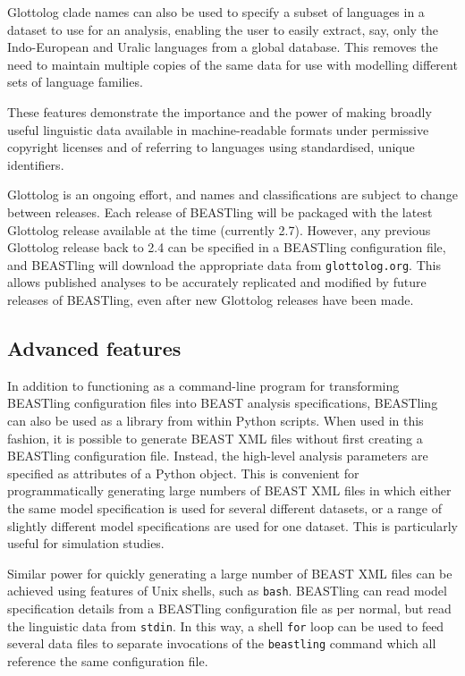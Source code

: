 \documentclass[twocolumn,10pt]{scrartcl}
\begin{document}
Glottolog clade names can also be used to specify a subset of languages in a dataset to use for an analysis, enabling the user to easily extract, say, only the Indo-European and Uralic languages from a global database.  This removes the need to maintain multiple copies of the same data for use with modelling different sets of language families.

These features demonstrate the importance and the power of making broadly useful linguistic data available in machine-readable formats under permissive copyright licenses and of referring to languages using standardised, unique identifiers.

Glottolog is an ongoing effort, and names and classifications are subject to change between releases.  Each release of BEASTling will be packaged with the latest Glottolog release available at the time (currently 2.7).  However, any previous Glottolog release back to 2.4 can be specified in a BEASTling configuration file, and BEASTling will download the appropriate data from \texttt{glottolog.org}.  This allows published analyses to be accurately replicated and modified by future releases of BEASTling, even after new Glottolog releases have been made.

\subsection{Advanced features}

In addition to functioning as a command-line program for transforming BEASTling configuration files into BEAST analysis specifications, BEASTling can also be used as a library from within Python scripts.  When used in this fashion, it is possible to generate BEAST XML files without first creating a BEASTling configuration file.  Instead, the high-level analysis parameters are specified as attributes of a Python object.  This is convenient for programmatically generating large numbers of BEAST XML files in which either the same model specification is used for several different datasets, or a range of slightly different model specifications are used for one dataset.  This is particularly useful for simulation studies.

Similar power for quickly generating a large number of BEAST XML files can be achieved using features of Unix shells, such as \texttt{bash}.  BEASTling can read model specification details from a BEASTling configuration file as per normal, but read the linguistic data from \texttt{stdin}.  In this way, a shell \texttt{for} loop can be used to feed several data files to separate invocations of the \texttt{beastling} command which all reference the same configuration file.
\end{document}
